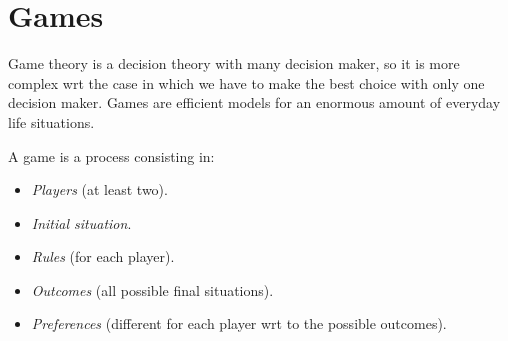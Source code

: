 \section{Games}

Game theory is a decision theory with many decision maker, so it is more complex wrt the case in which we have to make the best choice with only one decision maker. 
Games are efficient models for an enormous amount of everyday life situations. 

\begin{definition}
    A game is a process consisting in:
    \begin{itemize}
        \item \textit{Players} (at least two).
        \item \textit{Initial situation}. 
        \item \textit{Rules} (for each player).
        \item \textit{Outcomes} (all possible final situations).
        \item \textit{Preferences} (different for each player wrt to the possible outcomes).
    \end{itemize}
\end{definition}